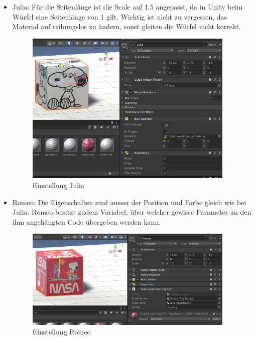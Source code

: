 \documentclass[../main.tex]{subfiles}
\begin{document}
    \begin{itemize}
        \item Julia:
        \newline Für die Seitenlänge ist die Scale auf 1.5 angepasst, da in Unity beim Würfel eine Seitenlänge von 1 gilt.
        Wichtig ist nicht zu vergessen, das Material auf reibungslos zu ändern, sonst gleiten die Würfel nicht korrekt.
        \begin{figure}[H]
            \begin{center}
                \centerline{\includegraphics[width=100mm]{./images/2Lab_JuliaCube.PNG}}
                \caption{Einstellung Julia}
                \label{fig:2Lab_JuliaCube}
            \end{center}
        \end{figure}

        \item Romeo:
        \newline Die Eigenschaften sind ausser der Position und Farbe gleich wie bei Julia.
        Romeo besitzt zudem Variabel, über welcher gewisse Parameter an den ihm angehängten Code übergeben werden kann.
        \begin{figure}[H]
            \begin{center}
                \centerline{\includegraphics[width=100mm]{./images/2Lab_RomeoCube.PNG}}
                \caption{Einstellung Romeo}
                \label{fig:2Lab_RomeoCube}
            \end{center}
        \end{figure}


\end{itemize}
\end{document}
